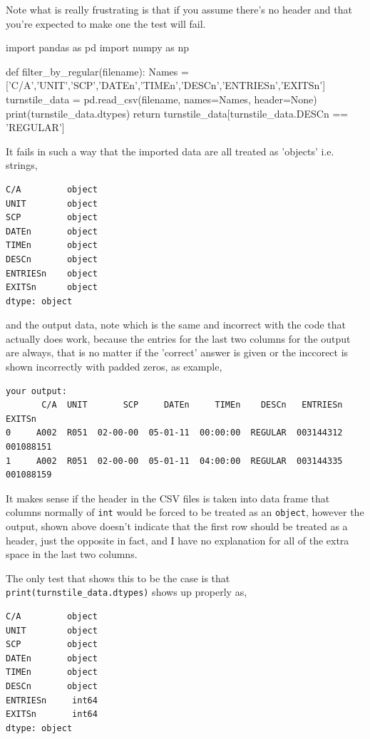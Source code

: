 \documentclass{article}
\numberwithin{questionCtr}{section}
\numberwithin{problemCtr}{section}
\begin{document}
Note what is really frustrating is that if you assume there's no header and that
you're expected to make one the test will fail.

\begin{python1}
import pandas as pd
import numpy as np

def filter_by_regular(filename):
    Names = ['C/A','UNIT','SCP','DATEn','TIMEn','DESCn','ENTRIESn','EXITSn']
    turnstile_data = pd.read_csv(filename, names=Names, header=None)
    print(turnstile_data.dtypes)
    return turnstile_data[turnstile_data.DESCn == 'REGULAR']
\end{python1}

It fails in such a way that the imported data are all treated as 'objects' i.e. strings,

\begin{verbatim}
C/A         object
UNIT        object
SCP         object
DATEn       object
TIMEn       object
DESCn       object
ENTRIESn    object
EXITSn      object
dtype: object
\end{verbatim}
and the output data, note which is the same and incorrect with the code that
actually does work, because the entries for the last two columns for the output
are always, that is no matter if the 'correct' answer is given or the inccorect
is shown incorrectly with padded zeros, as example,

{\footnotesize
\begin{verbatim}
your output:
       C/A  UNIT       SCP     DATEn     TIMEn    DESCn   ENTRIESn                     EXITSn
0     A002  R051  02-00-00  05-01-11  00:00:00  REGULAR  003144312                 001088151
1     A002  R051  02-00-00  05-01-11  04:00:00  REGULAR  003144335               001088159      
\end{verbatim}}
It makes sense if the header in the CSV files is taken into data frame that
columns normally of \verb|int| would be forced to be treated as an
\verb|object|, however the output, shown above doesn't indicate that the first
row should be treated as a header, just the opposite in fact, and I have no
explanation for all of the extra space in the last two columns.

The only test that shows this to be the case is that
\verb|print(turnstile_data.dtypes)| shows up properly as,

\begin{verbatim}
C/A         object
UNIT        object
SCP         object
DATEn       object
TIMEn       object
DESCn       object
ENTRIESn     int64
EXITSn       int64
dtype: object
\end{verbatim}
\end{document}
